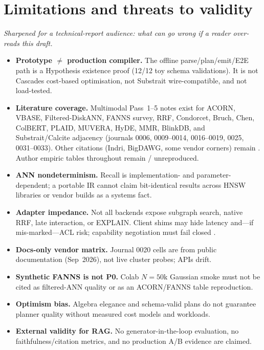 \section{Limitations and threats to validity}
\label{sec:threats}

\noindent\textit{Sharpened for a technical-report audience: what can go wrong if a reader over-reads this draft.}

\begin{itemize}[leftmargin=*]
  \item \textbf{Prototype $\neq$ production compiler.}
    The offline parse/plan/emit/E2E path is a Hypothesis existence proof (12/12 toy schema validations).
    It is not Cascades cost-based optimisation, not Substrait wire-compatible, and not load-tested.
  \item \textbf{Literature coverage.}
    Multimodal Pass~1--5 notes exist for ACORN, VBASE, Filtered-DiskANN, FANNS survey, RRF, Condorcet, Bruch, Chen, ColBERT, PLAID, MUVERA, HyDE, MMR, BlinkDB, and Substrait/Calcite adjacency (journals 0006, 0009--0014, 0016--0019, 0025, 0031--0033).
    Other citations (Indri, BigDAWG, some vendor corners) remain \provisional{}.
    Author empiric tables throughout remain \authoronly{} / unreproduced.
  \item \textbf{ANN nondeterminism.}
    Recall is implementation- and parameter-dependent; a portable IR cannot claim bit-identical results across HNSW libraries or vendor builds \established{} as a systems fact.
  \item \textbf{Adapter impedance.}
    Not all backends expose subgraph search, native RRF, late interaction, or EXPLAIN.
    Client shims may hide latency and---if mis-marked---ACL risk; capability negotiation must fail closed \hypothesis{}.
  \item \textbf{Docs-only vendor matrix.}
    Journal 0020 cells are from public documentation (Sep~2026), not live cluster probes; APIs drift.
  \item \textbf{Synthetic FANNS is not P0.}
    Colab $N{=}50$k Gaussian smoke must not be cited as filtered-ANN quality or as an ACORN/FANNS table reproduction.
  \item \textbf{Optimism bias.}
    Algebra elegance and schema-valid plans do not guarantee planner quality without measured cost models and workloads.
  \item \textbf{External validity for RAG.}
    No generator-in-the-loop evaluation, no faithfulness/citation metrics, and no production A/B evidence are claimed.
\end{itemize}
